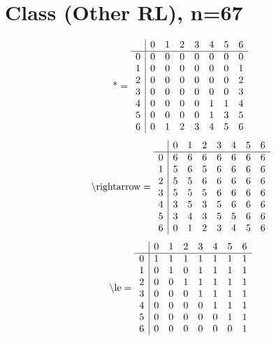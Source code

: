 \documentclass[11pt]{article}
\begin{document}
\section{Class (Other RL), n=67}
\[\text{*} = 
\begin{array}{r | r r r r r r r}
 & 0 & 1 & 2 & 3 & 4 & 5 & 6 \\ \hline
0 & 0 & 0 & 0 & 0 & 0 & 0 & 0 \\
1 & 0 & 0 & 0 & 0 & 0 & 0 & 1 \\
2 & 0 & 0 & 0 & 0 & 0 & 0 & 2 \\
3 & 0 & 0 & 0 & 0 & 0 & 0 & 3 \\
4 & 0 & 0 & 0 & 0 & 1 & 1 & 4 \\
5 & 0 & 0 & 0 & 0 & 1 & 3 & 5 \\
6 & 0 & 1 & 2 & 3 & 4 & 5 & 6 \\
\end{array}
\]
\[\text{\textbackslash rightarrow} = 
\begin{array}{r | r r r r r r r}
 & 0 & 1 & 2 & 3 & 4 & 5 & 6 \\ \hline
0 & 6 & 6 & 6 & 6 & 6 & 6 & 6 \\
1 & 5 & 6 & 5 & 6 & 6 & 6 & 6 \\
2 & 5 & 5 & 6 & 6 & 6 & 6 & 6 \\
3 & 5 & 5 & 5 & 6 & 6 & 6 & 6 \\
4 & 3 & 5 & 3 & 5 & 6 & 6 & 6 \\
5 & 3 & 4 & 3 & 5 & 5 & 6 & 6 \\
6 & 0 & 1 & 2 & 3 & 4 & 5 & 6 \\
\end{array}
\]
\[\text{\textbackslash le} = 
\begin{array}{r | r r r r r r r}
 & 0 & 1 & 2 & 3 & 4 & 5 & 6 \\ \hline
0 & 1 & 1 & 1 & 1 & 1 & 1 & 1 \\
1 & 0 & 1 & 0 & 1 & 1 & 1 & 1 \\
2 & 0 & 0 & 1 & 1 & 1 & 1 & 1 \\
3 & 0 & 0 & 0 & 1 & 1 & 1 & 1 \\
4 & 0 & 0 & 0 & 0 & 1 & 1 & 1 \\
5 & 0 & 0 & 0 & 0 & 0 & 1 & 1 \\
6 & 0 & 0 & 0 & 0 & 0 & 0 & 1 \\
\end{array}
\]
\end{document}
